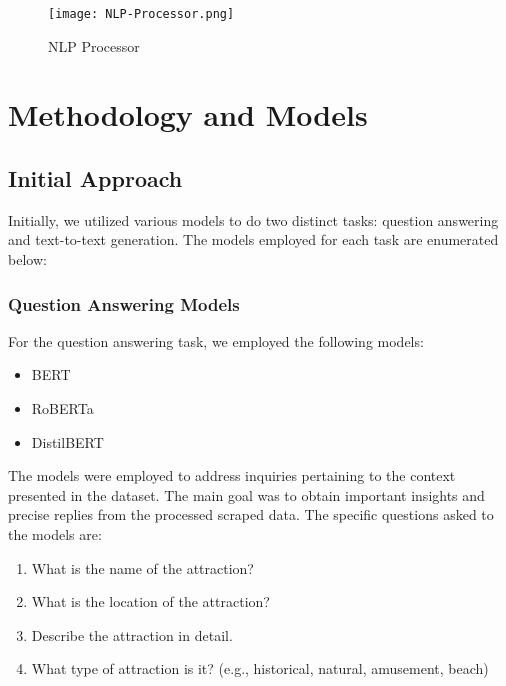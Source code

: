 \documentclass[conference]{IEEEtran}
\begin{document}
    \begin{figure}
        \centering
        \texttt{[image: NLP-Processor.png]}
        \caption{NLP Processor}
        \label{fig:nlp-processor}
    \end{figure}


\section{Methodology and Models}

    \subsection{Initial Approach}

        Initially, we utilized various models to do two distinct tasks: question answering and text-to-text generation. The models employed for each task are enumerated below:

        \subsubsection{Question Answering Models}
            For the question answering task, we employed the following models:
            \begin{itemize}
                \item BERT
                \item RoBERTa
                \item DistilBERT
            \end{itemize}

            The models were employed to address inquiries pertaining to the context presented in the dataset. The main goal was to obtain important insights and precise replies from the processed scraped data. The specific questions asked to the models are:

            \begin{tcolorbox}[linewidth=1pt, innerleftmargin=15pt, innerrightmargin=15pt, innertopmargin=15pt, innerbottommargin=15pt]
                \begin{enumerate}
                    \item What is the name of the attraction?
                    \item What is the location of the attraction?
                    \item Describe the attraction in detail.
                    \item What type of attraction is it? (e.g., historical, natural, amusement, beach)
                \end{enumerate}
            \end{tcolorbox}
\end{document}
